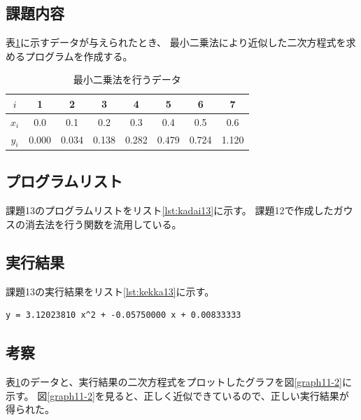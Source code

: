 \documentclass[a4j,titlepage]{jsarticle}
\begin{document}
\subsection{課題内容}
表\ref{tb:kadai13}に示すデータが与えられたとき、
最小二乗法により近似した二次方程式を求めるプログラムを作成する。

\begin{table}[H]
  \centering
  \caption{最小二乗法を行うデータ}
  \label{tb:kadai13}

  \begin{tabular}{|c||c|c|c|c|c|c|c|}
    \hline
    $i$ & 1 & 2 & 3 & 4 & 5 & 6 & 7 \\ \hline
    $x_i$ & 0.0 & 0.1 & 0.2 & 0.3 & 0.4 & 0.5 & 0.6 \\ \hline
    $y_i$ & 0.000 & 0.034 & 0.138 & 0.282 & 0.479 & 0.724 & 1.120 \\ \hline
  \end{tabular}
\end{table}

\subsection{プログラムリスト}
課題13のプログラムリストをリスト\ref{lst:kadai13}に示す。
課題12で作成したガウスの消去法を行う関数を流用している。



\subsection{実行結果}
課題13の実行結果をリスト\ref{lst:kekka13}に示す。

\begin{lstlisting}[style=text,caption=課題13の実行結果,label=lst:kekka13]
y = 3.12023810 x^2 + -0.05750000 x + 0.00833333
\end{lstlisting}

\subsection{考察}
表\ref{tb:kadai13}のデータと、実行結果の二次方程式をプロットしたグラフを図\ref{graph11-2}に示す。
図\ref{graph11-2}を見ると、正しく近似できているので、正しい実行結果が得られた。
\end{document}
